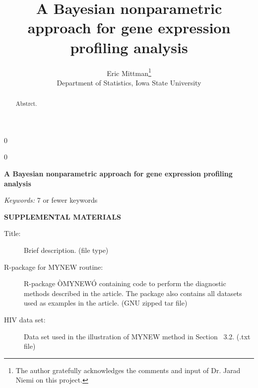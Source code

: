 \documentclass[12pt]{article}
\newcommand{\blind}{0}
\begin{document}
\newtoggle{thesis}
\togglefalse{thesis}

%

\def\spacingset#1{\renewcommand{\baselinestretch}%
{#1}\small\normalsize} \spacingset{1}
  
  
    
    \blind
  {
    \title{\bf A Bayesian nonparametric approach for gene expression profiling analysis}
    \author{Eric Mittman\thanks{
      The author gratefully acknowledges the comments and input of Dr. Jarad Niemi on this project.}\hspace{.2cm}\\
      Department of Statistics, Iowa State University}
    \maketitle
  } \fi
  
  \blind
  {
    \bigskip
    \bigskip
    \bigskip
    \begin{center}
    {\LARGE\bf A Bayesian nonparametric approach for gene expression profiling analysis}
    \end{center}
    \medskip
  } \fi
  
  \bigskip
  \begin{abstract}
  Abstrct.
  \end{abstract}
  
  \noindent%
  {\it Keywords:}  7 or fewer keywords
  
  \spacingset{1.45}
  
  

  
  \bigskip
  \begin{center}
  {\large\bf SUPPLEMENTAL MATERIALS}
  \end{center}
  
  \begin{description}
  
  \item[Title:] Brief description. (file type)
  
  \item[R-package for  MYNEW routine:] R-package ÒMYNEWÓ containing code to perform the diagnostic methods described in the article. The package also contains all datasets used as examples in the article. (GNU zipped tar file)
  
  \item[HIV data set:] Data set used in the illustration of MYNEW method in Section~ 3.2. (.txt file)
  
  \end{description}
  
  
  
  
\end{document}

